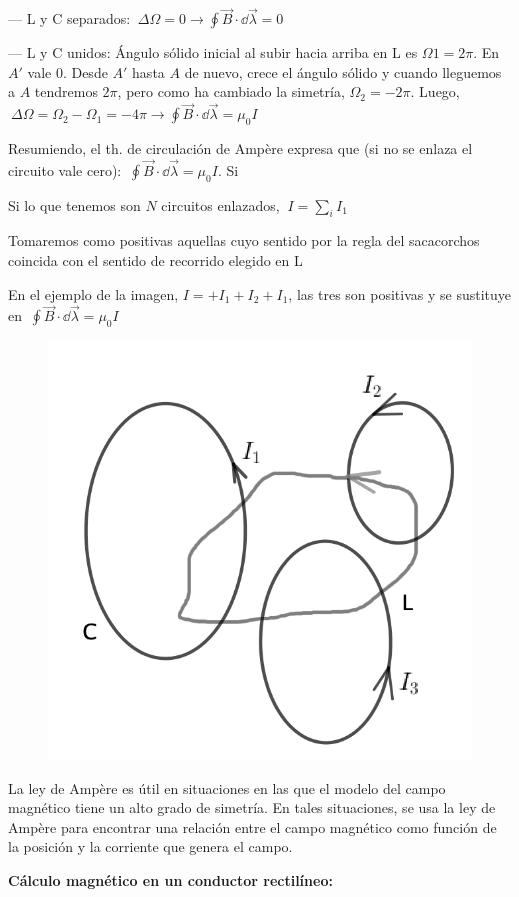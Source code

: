 --- L y C separados: $\ \Delta \Omega=0 \to \displaystyle \oint \vec B \cdot \dd \vec \lambda=0$

--- L y C unidos: Ángulo sólido inicial al subir hacia arriba en L es $\Omega1=2\pi$. En $A'$ vale $0$. Desde $A'$ hasta $A$ de nuevo, crece el ángulo sólido y cuando lleguemos a $A$ tendremos $2\pi$, pero como ha cambiado la simetría, $\Omega_2=-2\pi$. Luego,
$\ \Delta \Omega=\Omega_2-\Omega_1=-4\pi \to \displaystyle \oint \vec B \cdot \dd \vec \lambda = \mu_0 I$

Resumiendo, el th. de circulación de Ampère expresa que (si no se enlaza el circuito vale cero):
$\  \displaystyle \oint \vec B \cdot \dd \vec \lambda = \mu_0 I$. Si

Si lo que tenemos son $N$ circuitos enlazados, $\ I=\sum_i I_1$
\begin{multicols}{2}
Tomaremos como positivas aquellas cuyo sentido por la regla del sacacorchos coincida con el sentido de recorrido elegido en L

En el ejemplo de la imagen, $I=+I_1+I_2+I_1$, las tres son positivas y
se sustituye en $\  \displaystyle \oint \vec B \cdot \dd \vec \lambda = \mu_0 I$
\begin{figure}[H]
	\centering
	\includegraphics[width=.35\textwidth]{imagenes/imagenes27/T27IM04.png}
\end{figure}	
\end{multicols}

La ley de Ampère es útil en situaciones en las que el modelo del campo magnético tiene un alto grado de simetría. En tales situaciones, se usa la ley de Ampère para encontrar una relación entre el campo magnético como función de la posición y la corriente que genera el campo.

\textbf{Cálculo magnético en un conductor rectilíneo:}

